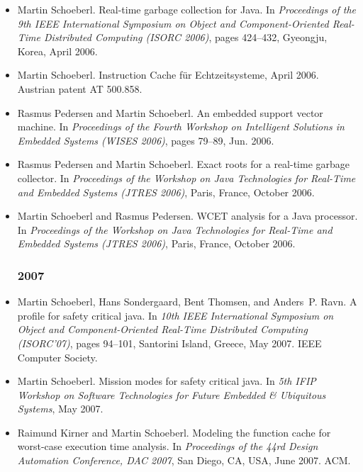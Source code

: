 \begin{itemize}
\item Martin Schoeberl.
 Real-time garbage collection for {J}ava.
 In {\em Proceedings of the 9th IEEE International Symposium on Object
  and Component-Oriented Real-Time Distributed Computing (ISORC 2006)}, pages
  424--432, Gyeongju, Korea, April 2006.

\item Martin Schoeberl. Instruction Cache f\"ur Echtzeitsysteme,
    April 2006. Austrian patent AT 500.858.

\item Rasmus Pedersen and Martin Schoeberl.
 An embedded support vector machine.
 In {\em Proceedings of the Fourth Workshop on Intelligent Solutions
  in Embedded Systems (WISES 2006)}, pages 79--89, Jun. 2006.

\item Rasmus Pedersen and Martin Schoeberl.
 Exact roots for a real-time garbage collector.
 In {\em Proceedings of the Workshop on {J}ava Technologies for
  Real-Time and Embedded Systems (JTRES 2006)}, Paris, France, October 2006.

\item Martin Schoeberl and Rasmus Pedersen.
 {WCET} analysis for a {Java} processor.
 In {\em Proceedings of the Workshop on {J}ava Technologies for
  Real-Time and Embedded Systems (JTRES 2006)}, Paris, France, October 2006.

\subsubsection*{2007}

\item Martin Schoeberl, Hans Sondergaard, Bent Thomsen, and Anders~P. Ravn.
A profile for safety critical java.
In {\em 10th IEEE International Symposium on Object and
  Component-Oriented Real-Time Distributed Computing (ISORC'07)}, pages
  94--101, Santorini Island, Greece, May 2007. IEEE Computer Society.

\item Martin Schoeberl.
Mission modes for safety critical java.
In {\em 5th IFIP Workshop on Software Technologies for Future
  Embedded \& Ubiquitous Systems}, May 2007.

\item Raimund Kirner and Martin Schoeberl.
Modeling the function cache for worst-case execution time analysis.
In {\em Proceedings of the 44rd Design Automation Conference, DAC
  2007}, San Diego, CA, USA, June 2007. ACM.


\end{itemize}
